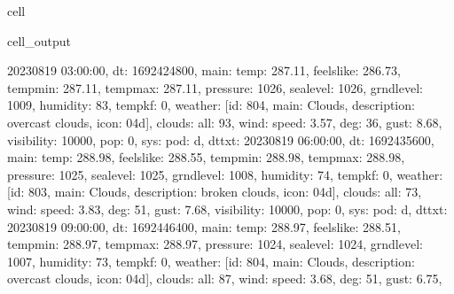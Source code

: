 \documentclass[letterpaper,10pt,english]{jupyterBook}
\begin{document}
\begin{sphinxuseclass}{cell}
\begin{sphinxVerbatimOutput}
\begin{sphinxuseclass}{cell_output}
\begin{sphinxVerbatim}[commandchars=\\\{\}]
\PYGZsq{}2023\PYGZhy{}08\PYGZhy{}19 03:00:00\PYGZsq{}\PYGZcb{}, \PYGZob{}\PYGZsq{}dt\PYGZsq{}: 1692424800, \PYGZsq{}main\PYGZsq{}: \PYGZob{}\PYGZsq{}temp\PYGZsq{}: 287.11, \PYGZsq{}feels\PYGZus{}like\PYGZsq{}: 286.73, \PYGZsq{}temp\PYGZus{}min\PYGZsq{}: 287.11, \PYGZsq{}temp\PYGZus{}max\PYGZsq{}: 287.11, \PYGZsq{}pressure\PYGZsq{}: 1026, \PYGZsq{}sea\PYGZus{}level\PYGZsq{}: 1026, \PYGZsq{}grnd\PYGZus{}level\PYGZsq{}: 1009, \PYGZsq{}humidity\PYGZsq{}: 83, \PYGZsq{}temp\PYGZus{}kf\PYGZsq{}: 0\PYGZcb{}, \PYGZsq{}weather\PYGZsq{}: [\PYGZob{}\PYGZsq{}id\PYGZsq{}: 804, \PYGZsq{}main\PYGZsq{}: \PYGZsq{}Clouds\PYGZsq{}, \PYGZsq{}description\PYGZsq{}: \PYGZsq{}overcast clouds\PYGZsq{}, \PYGZsq{}icon\PYGZsq{}: \PYGZsq{}04d\PYGZsq{}\PYGZcb{}], \PYGZsq{}clouds\PYGZsq{}: \PYGZob{}\PYGZsq{}all\PYGZsq{}: 93\PYGZcb{}, \PYGZsq{}wind\PYGZsq{}: \PYGZob{}\PYGZsq{}speed\PYGZsq{}: 3.57, \PYGZsq{}deg\PYGZsq{}: 36, \PYGZsq{}gust\PYGZsq{}: 8.68\PYGZcb{}, \PYGZsq{}visibility\PYGZsq{}: 10000, \PYGZsq{}pop\PYGZsq{}: 0, \PYGZsq{}sys\PYGZsq{}: \PYGZob{}\PYGZsq{}pod\PYGZsq{}: \PYGZsq{}d\PYGZsq{}\PYGZcb{}, \PYGZsq{}dt\PYGZus{}txt\PYGZsq{}: \PYGZsq{}2023\PYGZhy{}08\PYGZhy{}19 06:00:00\PYGZsq{}\PYGZcb{}, \PYGZob{}\PYGZsq{}dt\PYGZsq{}: 1692435600, \PYGZsq{}main\PYGZsq{}: \PYGZob{}\PYGZsq{}temp\PYGZsq{}: 288.98, \PYGZsq{}feels\PYGZus{}like\PYGZsq{}: 288.55, \PYGZsq{}temp\PYGZus{}min\PYGZsq{}: 288.98, \PYGZsq{}temp\PYGZus{}max\PYGZsq{}: 288.98, \PYGZsq{}pressure\PYGZsq{}: 1025, \PYGZsq{}sea\PYGZus{}level\PYGZsq{}: 1025, \PYGZsq{}grnd\PYGZus{}level\PYGZsq{}: 1008, \PYGZsq{}humidity\PYGZsq{}: 74, \PYGZsq{}temp\PYGZus{}kf\PYGZsq{}: 0\PYGZcb{}, \PYGZsq{}weather\PYGZsq{}: [\PYGZob{}\PYGZsq{}id\PYGZsq{}: 803, \PYGZsq{}main\PYGZsq{}: \PYGZsq{}Clouds\PYGZsq{}, \PYGZsq{}description\PYGZsq{}: \PYGZsq{}broken clouds\PYGZsq{}, \PYGZsq{}icon\PYGZsq{}: \PYGZsq{}04d\PYGZsq{}\PYGZcb{}], \PYGZsq{}clouds\PYGZsq{}: \PYGZob{}\PYGZsq{}all\PYGZsq{}: 73\PYGZcb{}, \PYGZsq{}wind\PYGZsq{}: \PYGZob{}\PYGZsq{}speed\PYGZsq{}: 3.83, \PYGZsq{}deg\PYGZsq{}: 51, \PYGZsq{}gust\PYGZsq{}: 7.68\PYGZcb{}, \PYGZsq{}visibility\PYGZsq{}: 10000, \PYGZsq{}pop\PYGZsq{}: 0, \PYGZsq{}sys\PYGZsq{}: \PYGZob{}\PYGZsq{}pod\PYGZsq{}: \PYGZsq{}d\PYGZsq{}\PYGZcb{}, \PYGZsq{}dt\PYGZus{}txt\PYGZsq{}: \PYGZsq{}2023\PYGZhy{}08\PYGZhy{}19 09:00:00\PYGZsq{}\PYGZcb{}, \PYGZob{}\PYGZsq{}dt\PYGZsq{}: 1692446400, \PYGZsq{}main\PYGZsq{}: \PYGZob{}\PYGZsq{}temp\PYGZsq{}: 288.97, \PYGZsq{}feels\PYGZus{}like\PYGZsq{}: 288.51, \PYGZsq{}temp\PYGZus{}min\PYGZsq{}: 288.97, \PYGZsq{}temp\PYGZus{}max\PYGZsq{}: 288.97, \PYGZsq{}pressure\PYGZsq{}: 1024, \PYGZsq{}sea\PYGZus{}level\PYGZsq{}: 1024, \PYGZsq{}grnd\PYGZus{}level\PYGZsq{}: 1007, \PYGZsq{}humidity\PYGZsq{}: 73, \PYGZsq{}temp\PYGZus{}kf\PYGZsq{}: 0\PYGZcb{}, \PYGZsq{}weather\PYGZsq{}: [\PYGZob{}\PYGZsq{}id\PYGZsq{}: 804, \PYGZsq{}main\PYGZsq{}: \PYGZsq{}Clouds\PYGZsq{}, \PYGZsq{}description\PYGZsq{}: \PYGZsq{}overcast clouds\PYGZsq{}, \PYGZsq{}icon\PYGZsq{}: \PYGZsq{}04d\PYGZsq{}\PYGZcb{}], \PYGZsq{}clouds\PYGZsq{}: \PYGZob{}\PYGZsq{}all\PYGZsq{}: 87\PYGZcb{}, \PYGZsq{}wind\PYGZsq{}: \PYGZob{}\PYGZsq{}speed\PYGZsq{}: 3.68, \PYGZsq{}deg\PYGZsq{}: 51, \PYGZsq{}gust\PYGZsq{}: 6.75\PYGZcb{}, 
\end{sphinxVerbatim}
\end{sphinxuseclass}
\end{sphinxVerbatimOutput}
\end{sphinxuseclass}
\end{document}
